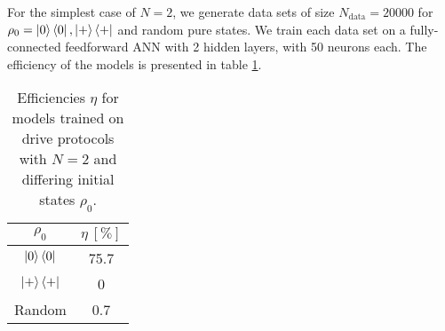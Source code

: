 For the simplest case of $N = 2$, we generate data sets of size $N_{\mathrm{data}} = 20000$ for $\rho_0 = \ket{0} \bra{0}, \ket{+} \bra{+}$ and random pure states.
We train each data set on a fully-connected feedforward ANN with 2 hidden layers, with 50 neurons each.
The efficiency of the models is presented in table \ref{n2efftable}.


\begin{table}[h]
	\centering
	\begin{tabular}{ c | c }
		$\rho_0$ & $\eta \ [\%]$ \\
		\hline
		$\ket{0} \bra{0}$ & 75.7 \\
		$\ket{+} \bra{+}$ & 0 \\
		Random & 0.7 \\
	\end{tabular}
	\caption{Efficiencies $\eta$ for models trained on drive protocols with $N = 2$ and differing initial states $\rho_0$.}
	\label{n2efftable}
\end{table}